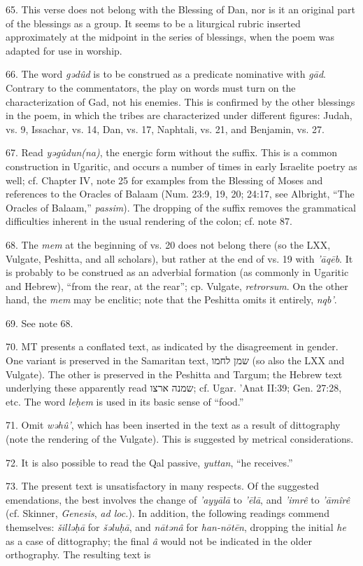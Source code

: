 \begin{enumerate}
65. This verse does not belong with the Blessing of Dan, nor is it an original
part of the blessings as a group. It seems to be a liturgical rubric inserted
approximately at the midpoint in the series of blessings, when the poem was
adapted for use in worship.

66. The word \emph{gədûd} is to be construed as a predicate nominative with
\emph{gād}. Contrary to the commentators, the play on words must turn on the
characterization of Gad, not his enemies. This is confirmed by the other
blessings in the poem, in which the tribes are characterized under different
figures: Judah, vs. 9, Issachar, vs. 14, Dan, vs. 17, Naphtali, vs. 21, and
Benjamin, vs. 27.

67. Read \emph{yəgûdun(na)}, the energic form without the suffix. This is a
common construction in Ugaritic, and occurs a number of times in early
Israelite poetry as well; cf. Chapter IV, note 25 for examples from the
Blessing of Moses and references to the Oracles of Balaam (Num. 23:9, 19, 20;
24:17, see Albright, ``The Oracles of Balaam,'' \emph{passim}). The dropping
of the suffix removes the grammatical difficulties inherent in the usual
rendering of the colon; cf. note 87.

68. The \emph{mem} at the beginning of vs. 20 does not belong there (so the
LXX, Vulgate, Peshitta, and all scholars), but rather at the end of vs. 19 with
\emph{'āqēb}. It is probably to be construed as an adverbial formation (as
commonly in Ugaritic and Hebrew), ``from the rear, at the rear''; cp. Vulgate,
\emph{retrorsum}. On the other hand, the \emph{mem} may be enclitic; note that
the Peshitta omits it entirely, \emph{nqb'}.

69. See note 68.

70. MT presents a conflated text, as indicated by the disagreement in gender.
One variant is preserved in the Samaritan text, שמן לחמו (so also the LXX and
Vulgate). The other is preserved in the Peshitta and Targum; the Hebrew text
underlying these apparently read שמנה ארצו; cf. Ugar. 'Anat II:39; Gen. 27:28,
etc. The word \emph{leḥem} is used in its basic sense of ``food.''

71. Omit \emph{wəhû'}, which has been inserted in the text as a result of
dittography (note the rendering of the Vulgate). This is suggested by metrical
considerations.

72. It is also possible to read the Qal passive, \emph{yuttan}, ``he receives.''

73. The present text is unsatisfactory in many respects. Of the suggested
emendations, the best involves the change of \emph{'ayyālā} to \emph{'ēlā},
and \emph{'imrê} to \emph{'āmîrê} (cf. Skinner, \emph{Genesis}, \emph{ad
loc.}). In addition, the following readings commend themselves:
\emph{šilləḥā} for \emph{šəluḥā}, and \emph{nātənâ} for \emph{han-nōtēn},
dropping the initial \emph{he} as a case of dittography; the final \emph{â}
would not be indicated in the older orthography. The resulting text is


\end{enumerate}
